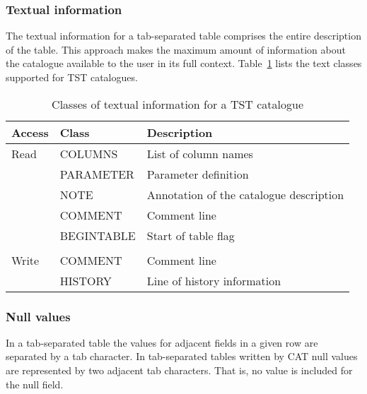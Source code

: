 \documentclass[11pt,twoside]{starlink}
\begin{document}
\subsubsection{Textual information}

The textual information for a tab-separated table comprises the entire
description of the table.  This approach makes the maximum amount of
information about the catalogue available to the user in its full context.
Table~\ref{TST_TEXT} lists the text classes supported for TST catalogues.

\begin{table}[htbp]

\begin{center}
\begin{tabular}{lll}
Access & Class        & Description   \\ \hline
Read   & COLUMNS      & List of column names \\
       & PARAMETER    & Parameter definition \\
       & NOTE         & Annotation of the catalogue description \\
       & COMMENT      & Comment line  \\
       & BEGINTABLE   & Start of table flag \\
       &              & \\
Write  & COMMENT      & Comment line  \\
       & HISTORY      & Line of history information \\
\end{tabular}
\end{center}

\caption{\label{TST_TEXT}Classes of textual information for a TST
catalogue}

\end{table}

\subsubsection{Null values}

In a tab-separated table the values for adjacent fields in a given row are
separated by a tab character.  In tab-separated tables written by CAT
null values are represented by two adjacent tab characters.  That is, no
value is included for the null field.



\end{document}
